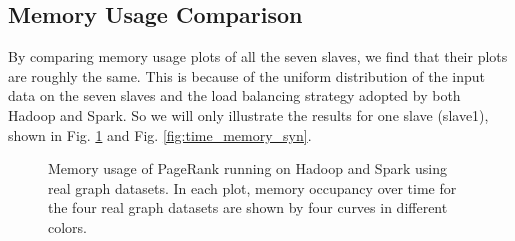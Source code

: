 \documentclass[12pt,conference,letterpaper]{IEEEtran}
\begin{document}

\subsection{Memory Usage Comparison}

 By comparing memory usage plots of all the seven slaves, we find that their plots are roughly the same. This is because of the uniform distribution of the input data on the seven slaves and the load balancing strategy adopted by both Hadoop and Spark. So we will only illustrate the results for one slave (slave1), shown in Fig. \ref{fig:time_memory_real} and Fig. \ref{fig:time_memory_syn}.
 
\begin{figure}[!t]
  \centering
  \caption{Memory usage of PageRank running on Hadoop and Spark using real graph datasets. In each plot, memory occupancy over time for the four real graph datasets are shown by four curves in different colors.}
  \label{fig:time_memory_real} 
\end{figure}
\end{document}
